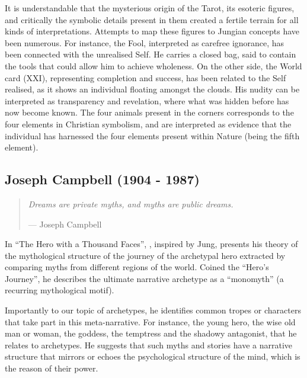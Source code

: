\documentclass[
]{book}
\begin{document}
It is understandable that the mysterious origin of the Tarot, its esoteric figures, and critically the symbolic details present in them created a fertile terrain for all kinds of interpretations. Attempts to map these figures to Jungian concepts have been numerous. For instance, the Fool, interpreted as carefree ignorance, has been connected with the unrealised Self. He carries a closed bag, said to contain the tools that could allow him to achieve wholeness. On the other side, the World card (XXI), representing completion and success, has been related to the Self realised, as it shows an individual floating amongst the clouds. His nudity can be interpreted as transparency and revelation, where what was hidden before has now become known. The four animals present in the corners corresponds to the four elements in Christian symbolism, and are interpreted as evidence that the individual has harnessed the four elements present within Nature (being the fifth element).

\hypertarget{joseph-campbell-1904---1987}{%
\subsection{Joseph Campbell (1904 - 1987)}\label{joseph-campbell-1904---1987}}

\begin{quote}
\emph{Dreams are private myths, and myths are public dreams.}

\hfill --- Joseph Campbell
\end{quote}

In ``The Hero with a Thousand Faces'', \citet{campbell1949hero}, inspired by Jung, presents his theory of the mythological structure of the journey of the archetypal hero extracted by comparing myths from different regions of the world. Coined the ``Hero's Journey'', he describes the ultimate narrative archetype as a ``monomyth'' (a recurring mythological motif).

Importantly to our topic of archetypes, he identifies common tropes or characters that take part in this meta-narrative. For instance, the young hero, the wise old man or woman, the goddess, the temptress and the shadowy antagonist, that he relates to archetypes. He suggests that such myths and stories have a narrative structure that mirrors or echoes the psychological structure of the mind, which is the reason of their power.
\end{document}
